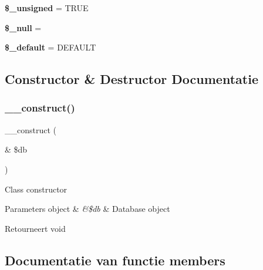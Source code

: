 \begin{DoxyCompactItemize}
\mbox{\label{class_c_i___d_b__forge_aae977ae6d61fa183f0b25422b6ddc31c}} 
{\bfseries \$\+\_\+unsigned} = T\+R\+UE
\item 
\mbox{\label{class_c_i___d_b__forge_ae58fe6a5104d4a069a49b27533ce808f}} 
{\bfseries \$\+\_\+null} = \textquotesingle{}\textquotesingle{}
\item 
\mbox{\label{class_c_i___d_b__forge_aa119e1b4e3d00f47a7b83b7066087915}} 
{\bfseries \$\+\_\+default} = \textquotesingle{} D\+E\+F\+A\+U\+LT \textquotesingle{}
\end{DoxyCompactItemize}


\subsection{Constructor \& Destructor Documentatie}
\mbox{\label{class_c_i___d_b__forge_aaf2ef772755ec6f361d44e16cc9ffd69}} 
\subsubsection{\texorpdfstring{\_\_construct()}{\_\_construct()}}
{\footnotesize\ttfamily \+\_\+\+\_\+construct (\begin{DoxyParamCaption}\item[{\&}]{\$db }\end{DoxyParamCaption})}

Class constructor


\begin{DoxyParams}[1]{Parameters}
object & {\em \&\$db} & Database object \\
\hline
\end{DoxyParams}
\begin{DoxyReturn}{Retourneert}
void 
\end{DoxyReturn}


\subsection{Documentatie van functie members}
\mbox{\label{class_c_i___d_b__forge_a41c6cae02f2fda8b429ad0afb9509426}} 
